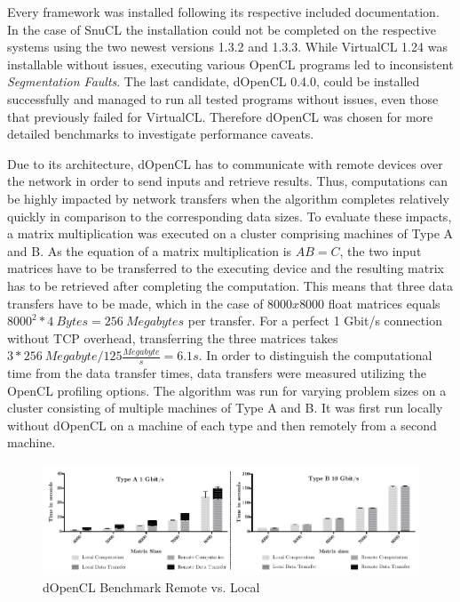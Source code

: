 Every framework was installed following its respective included documentation. In the case of SnuCL the installation could not be completed on the respective systems using the two newest versions 1.3.2 and 1.3.3. While VirtualCL 1.24 was installable without issues, executing various OpenCL programs led to inconsistent \textit{Segmentation Faults}. The last candidate, dOpenCL 0.4.0, could be installed successfully and managed to run all tested programs without issues, even those that previously failed for VirtualCL. Therefore dOpenCL was chosen for more detailed benchmarks to investigate performance caveats.

Due to its architecture, dOpenCL has to communicate with remote devices over the network in order to send inputs and retrieve results. Thus, computations can be highly impacted by network transfers when the algorithm completes relatively quickly in comparison to the corresponding data sizes. To evaluate these impacts, a matrix multiplication was executed on a cluster comprising machines of Type A and B. As the equation of a matrix multiplication is $AB = C$, the two input matrices have to be transferred to the executing device and the resulting matrix has to be retrieved after completing the computation. This means that three data transfers have to be made, which in the case of $8000x8000$ float matrices equals $8000^2 * 4\ Bytes = 256\ Megabytes$ per transfer. For a perfect 1 Gbit/s connection without TCP overhead, transferring the three matrices takes $3*256\ Megabyte / 125\frac{Megabyte}{s} = 6.1s$. In order to distinguish the computational time from the data transfer times, data transfers were measured utilizing the OpenCL profiling options. The algorithm was run for varying problem sizes on a cluster consisting of multiple machines of Type A and B. It was first run locally without dOpenCL on a machine of each type and then remotely from a second machine.

\begin{figure}[!htb]

\includegraphics[width=1.0\textwidth]{images/data_transfer.pdf}
\centering
\caption{dOpenCL Benchmark Remote vs. Local}
\label{img:data_transfer}
\end{figure}

